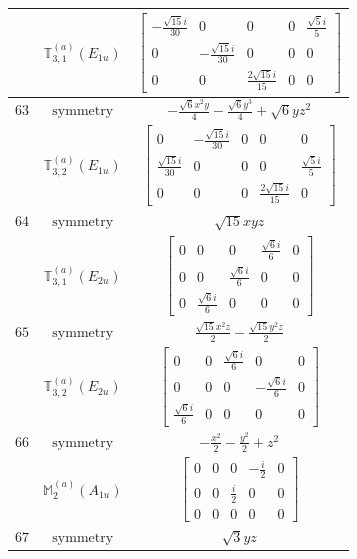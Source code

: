 \documentclass[fleqn,8pt,landscape]{jsarticle}
\begin{document}
\begin{longtable}{ccc}
$  $ & $ \mathbb{T}_{3,1}^{(a)}(E_{1u}) $ & $ \begin{bmatrix} - \frac{\sqrt{15} i}{30} & 0 & 0 & 0 & \frac{\sqrt{5} i}{5} \\ 0 & - \frac{\sqrt{15} i}{30} & 0 & 0 & 0 \\ 0 & 0 & \frac{2 \sqrt{15} i}{15} & 0 & 0 \end{bmatrix} $ \\ \hline
$ 63 $ & $ \text{symmetry} $ & $ - \frac{\sqrt{6} x^{2} y}{4} - \frac{\sqrt{6} y^{3}}{4} + \sqrt{6} y z^{2} $ \\
$  $ & $ \mathbb{T}_{3,2}^{(a)}(E_{1u}) $ & $ \begin{bmatrix} 0 & - \frac{\sqrt{15} i}{30} & 0 & 0 & 0 \\ \frac{\sqrt{15} i}{30} & 0 & 0 & 0 & \frac{\sqrt{5} i}{5} \\ 0 & 0 & 0 & \frac{2 \sqrt{15} i}{15} & 0 \end{bmatrix} $ \\ \hline
$ 64 $ & $ \text{symmetry} $ & $ \sqrt{15} x y z $ \\
$  $ & $ \mathbb{T}_{3,1}^{(a)}(E_{2u}) $ & $ \begin{bmatrix} 0 & 0 & 0 & \frac{\sqrt{6} i}{6} & 0 \\ 0 & 0 & \frac{\sqrt{6} i}{6} & 0 & 0 \\ 0 & \frac{\sqrt{6} i}{6} & 0 & 0 & 0 \end{bmatrix} $ \\ \hline
$ 65 $ & $ \text{symmetry} $ & $ \frac{\sqrt{15} x^{2} z}{2} - \frac{\sqrt{15} y^{2} z}{2} $ \\
$  $ & $ \mathbb{T}_{3,2}^{(a)}(E_{2u}) $ & $ \begin{bmatrix} 0 & 0 & \frac{\sqrt{6} i}{6} & 0 & 0 \\ 0 & 0 & 0 & - \frac{\sqrt{6} i}{6} & 0 \\ \frac{\sqrt{6} i}{6} & 0 & 0 & 0 & 0 \end{bmatrix} $ \\ \hline
$ 66 $ & $ \text{symmetry} $ & $ - \frac{x^{2}}{2} - \frac{y^{2}}{2} + z^{2} $ \\
$  $ & $ \mathbb{M}_{2}^{(a)}(A_{1u}) $ & $ \begin{bmatrix} 0 & 0 & 0 & - \frac{i}{2} & 0 \\ 0 & 0 & \frac{i}{2} & 0 & 0 \\ 0 & 0 & 0 & 0 & 0 \end{bmatrix} $ \\ \hline
$ 67 $ & $ \text{symmetry} $ & $ \sqrt{3} y z $ \\

\end{longtable}
\end{document}
